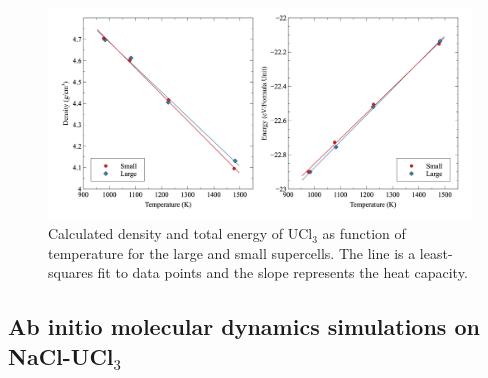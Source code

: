 \documentclass[preprint,3p,10pt,onecolumn,number,sort&compress]{elsarticle}
\begin{document}
\begin{figure}[htb]
\centering
\includegraphics[width=1.00\textwidth]{fig6.jpg}
\caption{Calculated density and total energy of UCl$_3$ as function of temperature for the large and small supercells. The line is a least-squares fit to data points and the slope represents the heat capacity.} 
\label{fig:UCl3size}
\end{figure}

\FloatBarrier

\subsection{Ab initio molecular dynamics simulations on NaCl-UCl$_3$}
\end{document}
